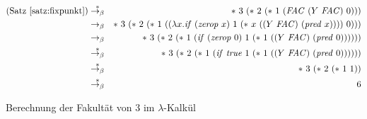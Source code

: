 \begin{figure}[!tb]
\begin{center}
\begin{eqnarray*}
    \text{(Satz~\ref{satz:fixpunkt})} &\overset{\ast}{\rightarrow_{\beta}}&
    \ast~3~(\ast~2~(\ast~1~(\mathit{FAC}~(Y~\mathit{FAC})~0)))\\
    &\rightarrow_{\beta}&
    \ast~3~(\ast~2~(\ast~1~((\lambda
    x.\mathit{if}~(\mathit{zerop}~x)~1~(\ast~x~((Y~\mathit{FAC})~(\mathit{pred}~x))))~0)))\\
%
%
    &\rightarrow_{\beta}&
    \ast~3~(\ast~2~(\ast~1~(\mathit{if}~(\mathit{zerop}~0)~1~(\ast~1~((Y~\mathit{FAC})~(\mathit{pred}~0))))))\\
    &\overset{\ast}{\rightarrow_{\beta}}&
    \ast~3~(\ast~2~(\ast~1~(\mathit{if}~\mathit{true}~1~(\ast~1~((Y~\mathit{FAC})~(\mathit{pred}~0))))))\\
    &\overset{\ast}{\rightarrow_{\beta}}&
    \ast~3~(\ast~2~(\ast~1~1))\\
    &\overset{\ast}{\rightarrow_{\beta}}&
    6
    \end{eqnarray*}
    \caption{Berechnung der Fakultät von 3 im $\lambda$-Kalkül}
    \label{fig:fac3}
  \end{center}
\end{figure}

